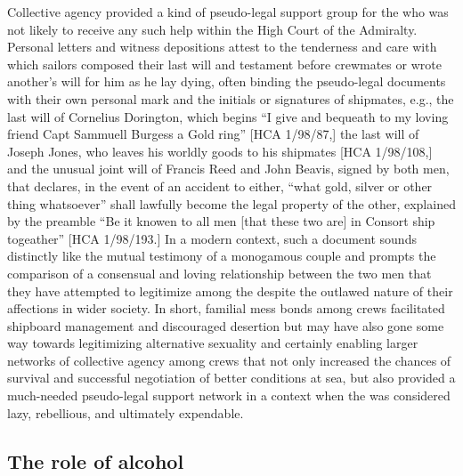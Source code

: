 Collective agency provided a kind of pseudo-legal support group for the  who was not likely to receive any such help within the High Court of the Admiralty. Personal letters and witness depositions attest to the tenderness and care with which sailors composed their last will and testament before crewmates or wrote another’s will for him as he lay dying, often binding the pseudo-legal documents with their own personal mark and the initials or signatures of shipmates, e.g., the last will of Cornelius Dorington, which begins “I give and bequeath to my loving friend Capt Sammuell Burgess a Gold ring” [HCA 1/98/87,] the last will of Joseph Jones, who leaves his worldly goods to his shipmates [HCA 1/98/108,] and the unusual joint will of Francis Reed and John Beavis, signed by both men, that declares, in the event of an accident to either, “what gold, silver or other thing whatsoever” shall lawfully become the legal property of the other, explained by the preamble “Be it knowen to all men [that these two are] in Consort ship togeather” [HCA 1/98/193.] In a modern context, such a document sounds distinctly like the mutual testimony of a monogamous couple and prompts the comparison of a consensual and loving relationship between the two men that they have attempted to legitimize among the  despite the outlawed nature of their affections in wider society. In short, familial mess bonds among crews facilitated shipboard management and discouraged desertion but may have also gone some way towards legitimizing alternative sexuality and certainly enabling larger networks of collective agency among crews that not only increased the chances of survival and successful negotiation of better conditions at sea, but also provided a much-needed pseudo-legal support network in a context when the  was considered lazy, rebellious, and ultimately expendable. 

\subsection{{The role of alcohol} }%

